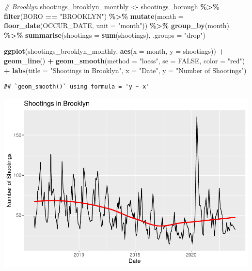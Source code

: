 \documentclass[
]{article}
\newenvironment{Shaded}{\begin{snugshade}}{\end{snugshade}}
\newcommand{\AttributeTok}[1]{\textcolor[rgb]{0.13,0.29,0.53}{#1}}
\newcommand{\CommentTok}[1]{\textcolor[rgb]{0.56,0.35,0.01}{\textit{#1}}}
\newcommand{\ConstantTok}[1]{\textcolor[rgb]{0.56,0.35,0.01}{#1}}
\newcommand{\FunctionTok}[1]{\textcolor[rgb]{0.13,0.29,0.53}{\textbf{#1}}}
\newcommand{\NormalTok}[1]{#1}
\newcommand{\OtherTok}[1]{\textcolor[rgb]{0.56,0.35,0.01}{#1}}
\newcommand{\SpecialCharTok}[1]{\textcolor[rgb]{0.81,0.36,0.00}{\textbf{#1}}}
\newcommand{\StringTok}[1]{\textcolor[rgb]{0.31,0.60,0.02}{#1}}
\begin{document}
\begin{Shaded}
\begin{Highlighting}[]
\CommentTok{\# Brooklyn}
\NormalTok{shootings\_brooklyn\_monthly }\OtherTok{\textless{}{-}}\NormalTok{ shootings\_borough }\SpecialCharTok{\%\textgreater{}\%}
  \FunctionTok{filter}\NormalTok{(BORO }\SpecialCharTok{==} \StringTok{"BROOKLYN"}\NormalTok{) }\SpecialCharTok{\%\textgreater{}\%}
  \FunctionTok{mutate}\NormalTok{(}\AttributeTok{month =} \FunctionTok{floor\_date}\NormalTok{(OCCUR\_DATE, }\AttributeTok{unit =} \StringTok{"month"}\NormalTok{)) }\SpecialCharTok{\%\textgreater{}\%}
  \FunctionTok{group\_by}\NormalTok{(month) }\SpecialCharTok{\%\textgreater{}\%}
  \FunctionTok{summarise}\NormalTok{(}\AttributeTok{shootings =} \FunctionTok{sum}\NormalTok{(shootings), }\AttributeTok{.groups =} \StringTok{"drop"}\NormalTok{)}

\FunctionTok{ggplot}\NormalTok{(shootings\_brooklyn\_monthly, }\FunctionTok{aes}\NormalTok{(}\AttributeTok{x =}\NormalTok{ month, }\AttributeTok{y =}\NormalTok{ shootings)) }\SpecialCharTok{+}
  \FunctionTok{geom\_line}\NormalTok{() }\SpecialCharTok{+}
  \FunctionTok{geom\_smooth}\NormalTok{(}\AttributeTok{method =} \StringTok{"loess"}\NormalTok{, }\AttributeTok{se =} \ConstantTok{FALSE}\NormalTok{, }\AttributeTok{color =} \StringTok{"red"}\NormalTok{) }\SpecialCharTok{+}
  \FunctionTok{labs}\NormalTok{(}\AttributeTok{title =} \StringTok{"Shootings in Brooklyn"}\NormalTok{,}
       \AttributeTok{x =} \StringTok{"Date"}\NormalTok{,}
       \AttributeTok{y =} \StringTok{"Number of Shootings"}\NormalTok{)}
\end{Highlighting}
\end{Shaded}

\begin{verbatim}
## `geom_smooth()` using formula = 'y ~ x'
\end{verbatim}

\includegraphics{nypd-shooting-data-analysis_files/figure-latex/trend-shootings-brooklyn-1.pdf}
\end{document}
